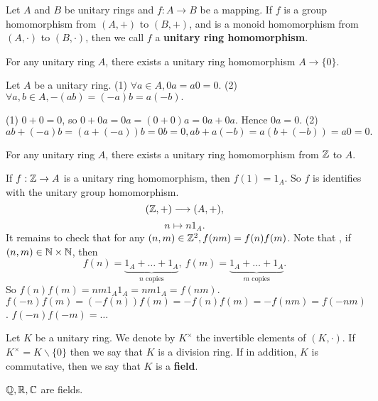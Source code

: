 \documentclass{book}
\numberwithin{equation}{section}
\begin{document}
\begin{definitionenv}
    Let $A$ and $B$ be unitary rings and $f:A\rightarrow B$ be a mapping. If $f$ is a group homomorphism from $(A, +)$ to $(B, +)$,  and is a monoid homomorphism from $(A, \cdot)$ to $(B, \cdot)$,  then we call $f$ a \textbf{unitary ring homomorphism}. 
\end{definitionenv}
\begin{propositionenv}
    For any unitary ring $A$,  there exists a unitary ring homomorphism $A\rightarrow\{0\}$.
\end{propositionenv}
\begin{lemmaenv}
    Let $A$ be a unitary ring.
    \newline
    (1) $\forall a\in A,  0a=a0=0.$
    \newline
    (2) $\forall a, b\in A,  -(ab)=(-a)b=a(-b).$
\end{lemmaenv}
\begin{proofenv}
    \quad\newline
    (1) $0+0=0$,  so $0+0a=0a=(0+0)a=0a+0a$. Hence $0a=0$.
    \newline
    (2) $ab+(-a)b=(a+(-a))b=0b=0, ab+a(-b)=a(b+(-b))=a0=0.$
\end{proofenv}
\begin{propositionenv}
    For any unitary ring $A$,  there exists a unitary ring homomorphism from $\mathbb{Z}$ to $A$.
\end{propositionenv}
\begin{proofenv}
    If $f:\mathbb{Z} \rightarrow A$ is a unitary ring homomorphism,  then $f(1)=1_A$. So $f$ is identifies with the unitary group homomorphism.
    $$(\mathbb{Z}, +)\longrightarrow(A, +), $$
    $$n\longmapsto n1_A.$$
    It remains to check that for any $(n, m)\in \mathbb{Z}^2, f(nm)=f(n)f(m)$. Note that ,  if $(n, m)\in \mathbb{N}\times\mathbb{N}$,  then 
    $$f(n)=\underset{n \text{ copies}}{\underbrace{1_A+\dots+1_A}}, \ f(m)=\underset{m \text{ copies}}{\underbrace{1_A+\dots+1_A}}.$$
    So $f(n)f(m)=nm1_A1_A=nm1_A=f(nm)$.
    $f(-n)f(m)=(-f(n))f(m)=-f(n)f(m)=-f(nm)=f(-nm)$.
    $f(-n)f(-m)=\dots$
\end{proofenv}
\begin{definitionenv}
    Let $K$ be a unitary ring. We denote by $K^\times$ the invertible elements of $(K, \cdot)$. If $K^\times=K\backslash\{0\}$ then we say that $K$ is a division ring. If in addition,  $K$ is commutative,  then we say that $K$ is a \textbf{field}.
\end{definitionenv}
\begin{exampleenv}
    $\mathbb{Q}, \mathbb{R}, \mathbb{C}$ are fields.
\end{exampleenv}
\end{document}
